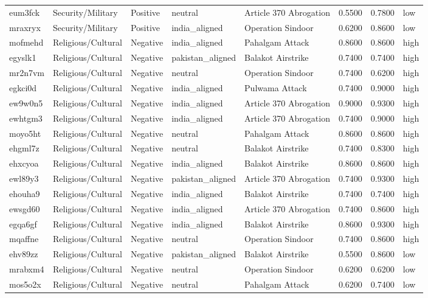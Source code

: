\begin{longtable}{lllllrrl}
eum3fck & Security/Military & Positive & neutral & Article 370 Abrogation & 0.5500 & 0.7800 & low \\
mraxryx & Security/Military & Positive & india\_aligned & Operation Sindoor & 0.6200 & 0.8600 & low \\
mofmehd & Religious/Cultural & Negative & india\_aligned & Pahalgam Attack & 0.8600 & 0.8600 & high \\
egyslk1 & Religious/Cultural & Negative & pakistan\_aligned & Balakot Airstrike & 0.7400 & 0.7400 & high \\
mr2n7vm & Religious/Cultural & Negative & neutral & Operation Sindoor & 0.7400 & 0.6200 & high \\
egkci0d & Religious/Cultural & Negative & india\_aligned & Pulwama Attack & 0.7400 & 0.9000 & high \\
ew9w0n5 & Religious/Cultural & Negative & india\_aligned & Article 370 Abrogation & 0.9000 & 0.9300 & high \\
ewhtgm3 & Religious/Cultural & Negative & india\_aligned & Article 370 Abrogation & 0.7400 & 0.9000 & high \\
moyo5ht & Religious/Cultural & Negative & neutral & Pahalgam Attack & 0.8600 & 0.8600 & high \\
ehgml7z & Religious/Cultural & Negative & neutral & Balakot Airstrike & 0.7400 & 0.8300 & high \\
ehxcyoa & Religious/Cultural & Negative & india\_aligned & Balakot Airstrike & 0.8600 & 0.8600 & high \\
ewl89y3 & Religious/Cultural & Negative & pakistan\_aligned & Article 370 Abrogation & 0.7400 & 0.9300 & high \\
ehouha9 & Religious/Cultural & Negative & india\_aligned & Balakot Airstrike & 0.7400 & 0.7400 & high \\
ewsgd60 & Religious/Cultural & Negative & india\_aligned & Article 370 Abrogation & 0.7400 & 0.8600 & high \\
egqa6gf & Religious/Cultural & Negative & india\_aligned & Balakot Airstrike & 0.8600 & 0.9300 & high \\
mqaffne & Religious/Cultural & Negative & neutral & Operation Sindoor & 0.7400 & 0.8600 & high \\
ehv89zz & Religious/Cultural & Negative & pakistan\_aligned & Balakot Airstrike & 0.5500 & 0.8600 & low \\
mrabxm4 & Religious/Cultural & Negative & neutral & Operation Sindoor & 0.6200 & 0.6200 & low \\
mos5o2x & Religious/Cultural & Negative & neutral & Pahalgam Attack & 0.6200 & 0.7400 & low \\

\end{longtable}
